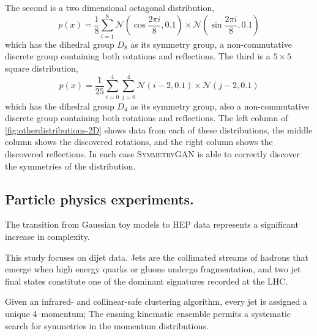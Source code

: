                 The second is a two dimensional octagonal distribution,
                \[
                    p(x) = \frac{1}{8}\sum_{i=1}^{8} \mathcal{N}(\cos\frac{2\pi i}{8}, 0.1)\times \mathcal{N}(\sin\frac{2\pi i}{8}, 0.1)
                \]
                which has the dihedral group \(D_8\) as its symmetry group, a non-commutative discrete group containing both rotations and reflections.
                The third is a \(5\times 5\) square distribution,
                \[
                    p(x) = \frac{1}{25}\sum_{i=0}^{4}\sum_{j=0}^{4} \mathcal{N}(i-2, 0.1)\times \mathcal{N}(j-2, 0.1)
                \]
                which has the dihedral group \(D_4\) as its symmetry group, also a non-commutative discrete group containing both rotations and reflections.
                The left column of \cref{fig:otherdistributions-2D} shows data from each of these distributions, the middle column shows the discovered rotations, and the right column shows the discovered reflections.
                In each case \textsc{SymmetryGAN} is able to correctly discover the symmetries of the distribution.

        \subsection{Particle physics experiments.}
            
            The transition from Gaussian toy models to HEP data represents a significant increase in complexity.

            This study focuses on dijet data.
            Jets are the collimated streams of hadrons that emerge when high energy quarks or gluons undergo fragmentation, and two jet final states constitute one of the dominant signatures recorded at the LHC.
            
            Given an infrared- and collinear-safe clustering algorithm, every jet is assigned a unique 4--momentum;
            The ensuing kinematic ensemble permits a systematic search for symmetries in the momentum distributions.

